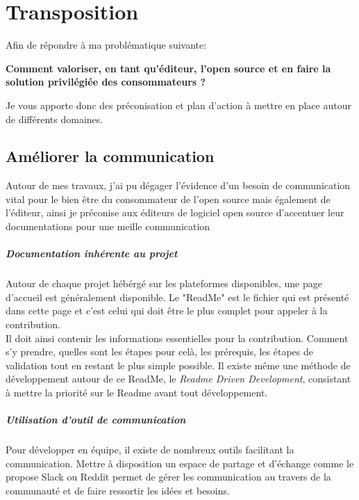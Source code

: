 \chapter{Transposition} %

Afin de répondre à ma problématique suivante:

\textbf{Comment valoriser, en tant qu'éditeur, l'open source et en faire la solution privilégiée des consommateurs ?}

Je vous apporte donc des préconisation et plan d'action à mettre en place autour de différents domaines.

\section{Améliorer la communication}

	Autour de mes travaux, j'ai pu dégager l'évidence d'un besoin de communication vital pour le bien être du consommateur de l'open source mais également de l'éditeur, ainsi je préconise aux éditeurs de logiciel open source d'accentuer leur documentations pour une meille communication

	\paragraph{Documentation inhérente au projet\\}

	Autour de chaque projet hébérgé sur les plateformes disponibles, une page d'accueil est généralement disponible. Le "ReadMe" est le fichier qui est présenté dans cette page et c'est celui qui doit être le plus complet pour appeler à la contribution. \\

	Il doit ainsi contenir les informations essentielles pour la contribution. Comment s'y prendre, quelles sont les étapes pour celà, les prérequis, les étapes de validation tout en restant le plus simple possible. Il existe même une méthode de développement autour de ce ReadMe, le \emph{Readme Driven Development}, consistant à mettre la priorité sur le Readme avant tout développement.

	\paragraph{Utilisation d'outil de communication\\}

	Pour développer en équipe, il existe de nombreux outils facilitant la communication. Mettre à disposition un espace de partage et d'échange comme le propose Slack ou Reddit permet de gérer les communication au travers de la communauté et de faire ressortir les idées et besoins.

